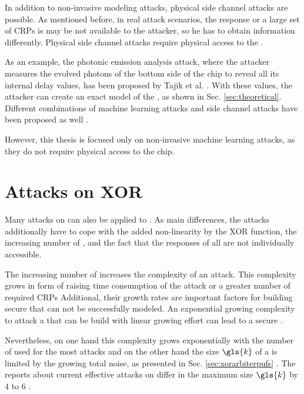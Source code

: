 In addition to non-invasive modeling attacks, physical side channel attacks are possible.
As mentioned before, in real attack scenarios, the \puf response or a large set of \acp{CRP} is may be not available to the attacker, so he has to obtain information differently.
Physical side channel attacks require physical access to the \puf. %

As an example, the photonic emission analysis attack, where the attacker measures the evolved photons of the bottom side of the \apuf chip to reveal all its internal delay values, has been proposed by Tajik et al. \cite{Tajik2014PhysicalPUFs}.
With these values, the attacker can create an exact model of the \apuf, as shown in Sec. \ref{sec:theoretical}. %
Different combinations of machine learning attacks and side channel attacks have been proposed as well \cite{Mahmoud2013CombinedPUFs, Xu2014Hybrid}.

However, this thesis is focused only on non-invasive machine learning attacks, as they do not require physical access to the \apuf chip.


\section{Attacks on \acs{XOR} \apufs}
\label{sec:attacksonxorarbiter}

Many attacks on \apufs can also be applied to \xpufs.
As main differences, the attacks additionally have to cope with the added non-linearity by the \ac{XOR} function, the increasing number of \apufs, and the fact that the responses of all \apufs are not individually accessible.

The increasing number of \apufs increases the complexity of an attack.
This complexity grows in form of raising time consumption of the attack or a greater number of required \acp{CRP}
Additional, their growth rates are important factors for building secure \xpufs that can not be successfully modeled.
An exponential growing complexity to attack a \xpuf that can be build with linear growing effort can lead to a secure \puf.

Nevertheless, on one hand this complexity grows exponentially with the number of used \apufs for the most attacks and on the other hand the size $\gls{k}$ of a \xpuf is limited by the growing total noise, as presented in Sec. \ref{sec:xorarbiterpufs} \cite{Ruhrmair2010ModelingFunctions}. %
The reports about current effective attacks on \xpufs differ in the maximum size $\gls{k}$ by $4$ to $6$ \cite{Ganji2015WhyPUFs, Xu2014Hybrid}.

